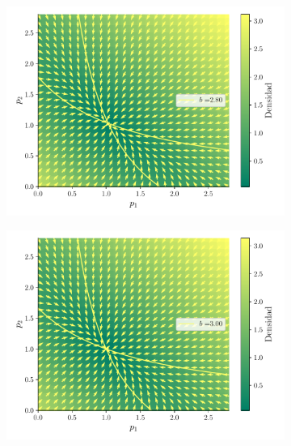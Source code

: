 \documentclass[twocolumn,aps,prl]{revtex4-1}
\begin{document}
\begin{figure}[ht!]
\begin{subfigure}[b]{0.49\linewidth}
  \end{subfigure}\quad
  \begin{subfigure}[b]{0.49\linewidth}
      \centering
      \includegraphics[width = 0.999\textwidth]{figuras/ex02-cosa3-2.pdf}
  \end{subfigure}\quad
  \begin{subfigure}[b]{0.49\linewidth}
      \centering
      \includegraphics[width = 0.999\textwidth]{figuras/ex02-cosa3-3.pdf}
  \end{subfigure}\quad
  \begin{subfigure}[b]{0.49\linewidth}
      \centering

\end{subfigure}
\end{figure}
\end{document}
